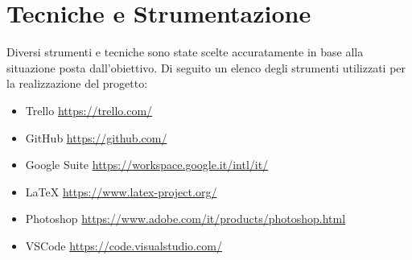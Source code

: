 \documentclass{report}
\begin{document}
\chapter{Tecniche e Strumentazione}
Diversi strumenti e tecniche sono state scelte accuratamente in base alla situazione posta dall’obiettivo. Di seguito un elenco degli strumenti utilizzati per la realizzazione del progetto:

\begin{itemize}
	\item Trello \qquad \url{https://trello.com/}
	\item GitHub \qquad \url{https://github.com/}
	\item Google Suite \qquad \url{https://workspace.google.it/intl/it/}
	\item LaTeX \qquad \url{https://www.latex-project.org/}
	\item Photoshop \qquad \url{https://www.adobe.com/it/products/photoshop.html}
	\item VSCode \qquad \url{https://code.visualstudio.com/}
\end{itemize}
\end{document}
